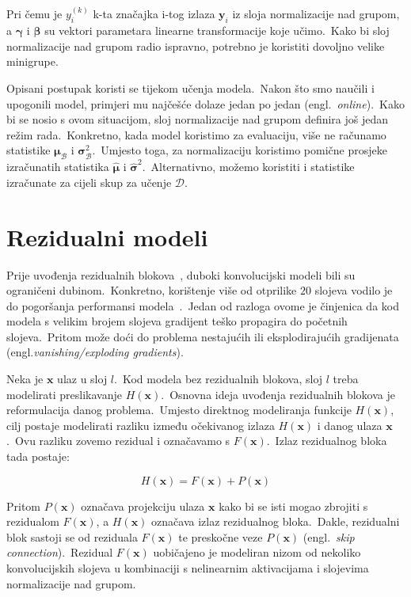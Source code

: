 \documentclass[diplomskirad]{fer}
\begin{document}
Pri čemu je $y_i^{(k)}$ k-ta značajka i-tog izlaza $\bm{y}_i$ iz sloja normalizacije nad grupom, a $\bm{\gamma}$ i $\bm{\beta}$ su vektori parametara linearne transformacije koje učimo.\ 
Kako bi sloj normalizacije nad grupom radio ispravno, potrebno je koristiti dovoljno velike minigrupe.\ 

Opisani postupak koristi se tijekom učenja modela.\ Nakon što smo naučili i upogonili model, primjeri mu najčešće dolaze jedan po jedan (engl.\ \textit{online}).\ 
Kako bi se nosio s ovom situacijom, sloj normalizacije nad grupom definira još jedan režim rada.\ 
Konkretno, kada model koristimo za evaluaciju, više ne računamo statistike $\bm{\mu}_{\mathcal{B}}$ i $\bm{\sigma}_{\mathcal{B}}^2$.\ 
Umjesto toga, za normalizaciju koristimo pomične prosjeke izračunatih statistika $\bm{\hat{\mu}}$ i $\bm{\hat{\sigma}}^2$.\ Alternativno, možemo koristiti i statistike izračunate za cijeli skup za učenje $\mathcal{D}$.\

\pagebreak

\section{Rezidualni modeli}
\label{sek:residual}

Prije uvođenja rezidualnih blokova~\cite{he2016deep}, duboki konvolucijski modeli bili su ograničeni dubinom.\ Konkretno, korištenje više od otprilike $20$ slojeva vodilo je do pogoršanja performansi modela~\cite{he2016deep}.\ 
Jedan od razloga ovome je činjenica da kod modela s velikim brojem slojeva gradijent teško propagira do početnih slojeva.\ 
Pritom može doći do problema nestajućih ili eksplodirajućih gradijenata (engl.\textit{vanishing/exploding gradients}).\

Neka je $\bm{x}$ ulaz u sloj $l$.\ Kod modela bez rezidualnih blokova, sloj $l$ treba modelirati preslikavanje $H(\bm{x})$.\ 
Osnovna ideja uvođenja rezidualnih blokova je reformulacija danog problema.\ Umjesto direktnog modeliranja funkcije $H(\bm{x})$, cilj postaje modelirati razliku između očekivanog izlaza $H(\bm{x})$ i danog ulaza $\bm{x}$.\ 
Ovu razliku zovemo rezidual i označavamo s $F(\bm{x})$.\ Izlaz rezidualnog bloka tada postaje:

\begin{equation}
  H(\bm{x}) = F(\bm{x}) + P(\bm{x})
  \label{eq:residual_formula}
\end{equation}

Pritom $P(\bm{x})$ označava projekciju ulaza $\bm{x}$ kako bi se isti mogao zbrojiti s rezidualom $F(\bm{x})$, a $H(\bm{x})$ označava izlaz rezidualnog bloka.\ 
Dakle, rezidualni blok sastoji se od reziduala $F(\bm{x})$ te preskočne veze $P(\bm{x})$ (engl.\ \textit{skip connection}).\ 
Rezidual $F(\bm{x})$ uobičajeno je modeliran nizom od nekoliko konvolucijskih slojeva u kombinaciji s nelinearnim aktivacijama i slojevima normalizacije nad grupom.\  
\end{document}
